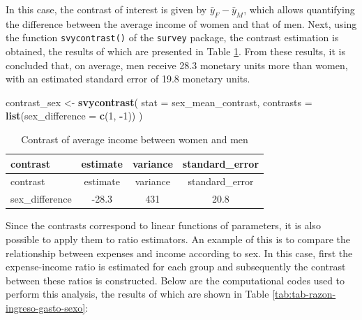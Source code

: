 \documentclass[
  english,
  12pt,
]{book}
\newenvironment{Shaded}{\begin{snugshade}}{\end{snugshade}}
\newcommand{\AttributeTok}[1]{\textcolor[rgb]{0.13,0.29,0.53}{#1}}
\newcommand{\DecValTok}[1]{\textcolor[rgb]{0.00,0.00,0.81}{#1}}
\newcommand{\FunctionTok}[1]{\textcolor[rgb]{0.13,0.29,0.53}{\textbf{#1}}}
\newcommand{\NormalTok}[1]{#1}
\newcommand{\OtherTok}[1]{\textcolor[rgb]{0.56,0.35,0.01}{#1}}
\newcommand{\SpecialCharTok}[1]{\textcolor[rgb]{0.81,0.36,0.00}{\textbf{#1}}}
\begin{document}
In this case, the contrast of interest is given by \(\bar{y}_{F} - \bar{y}_{M}\), which allows quantifying the difference between the average income of women and that of men. Next, using the function \texttt{svycontrast()} of the \texttt{survey} package, the contrast estimation is obtained, the results of which are presented in Table \ref{tab:tab-contraste-sexo}. From these results, it is concluded that, on average, men receive 28.3 monetary units more than women, with an estimated standard error of 19.8 monetary units.

\begin{Shaded}
\begin{Highlighting}[]
\NormalTok{contrast\_sex }\OtherTok{\textless{}{-}} \FunctionTok{svycontrast}\NormalTok{(}
  \AttributeTok{stat =}\NormalTok{ sex\_mean\_contrast,}
  \AttributeTok{contrasts =} \FunctionTok{list}\NormalTok{(}\AttributeTok{sex\_difference =} \FunctionTok{c}\NormalTok{(}\DecValTok{1}\NormalTok{, }\SpecialCharTok{{-}}\DecValTok{1}\NormalTok{))}
\NormalTok{)}
\end{Highlighting}
\end{Shaded}

\begin{longtable}[]{@{}lccc@{}}
\caption{\label{tab:tab-contraste-sexo}Contrast of average income between women and men}\tabularnewline
\toprule\noalign{}
contrast & estimate & variance & standard\_error \\
\midrule\noalign{}
\endfirsthead
\toprule\noalign{}
contrast & estimate & variance & standard\_error \\
\midrule\noalign{}
\endhead
\bottomrule\noalign{}
\endlastfoot
sex\_difference & -28.3 & 431 & 20.8 \\
\end{longtable}

Since the contrasts correspond to linear functions of parameters, it is also possible to apply them to ratio estimators. An example of this is to compare the relationship between expenses and income according to sex. In this case, first the expense-income ratio is estimated for each group and subsequently the contrast between these ratios is constructed. Below are the computational codes used to perform this analysis, the results of which are shown in Table \ref{tab:tab-razon-ingreso-gasto-sexo}:
\end{document}
